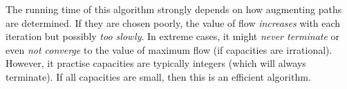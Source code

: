 \begin{example}
\begin{center}
    \end{center}
\end{example}

The running time of this algorithm strongly depends on how
augmenting paths are determined.
If they are chosen poorly, the value of flow \emph{increases} with
each iteration but possibly \emph{too slowly}.
In extreme cases, it might \emph{never terminate} or even
\emph{not converge} to the value of maximum flow
(if capacities are irrational).
However, it practise capacities are typically integers
(which will always terminate).
If all capacities are small, then this is an efficient algorithm.

